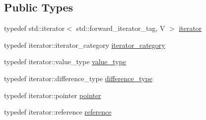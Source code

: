 \subsection*{Public Types}
\begin{DoxyCompactItemize}
\item 
typedef std\+::iterator$<$ std\+::forward\+\_\+iterator\+\_\+tag, V $>$ \hyperlink{structmui_1_1index__iterator_aceb32ff6af026ed8662f9fb30ea5cbe7}{iterator}
\item 
typedef iterator\+::iterator\+\_\+category \hyperlink{structmui_1_1index__iterator_a3a8f9b635405aaa0a076020be25cbf0b}{iterator\+\_\+category}
\item 
typedef iterator\+::value\+\_\+type \hyperlink{structmui_1_1index__iterator_a795af944e7eb34f4842a7f5d138fe186}{value\+\_\+type}
\item 
typedef iterator\+::difference\+\_\+type \hyperlink{structmui_1_1index__iterator_a1c78c601f90f622d37e36255c6e7260a}{difference\+\_\+type}
\item 
typedef iterator\+::pointer \hyperlink{structmui_1_1index__iterator_afbdc05d0a9403f2fb4002373c06dce97}{pointer}
\item 
typedef iterator\+::reference \hyperlink{structmui_1_1index__iterator_a3854dd112d5ca1a649babb0357e02394}{reference}
\end{DoxyCompactItemize}
